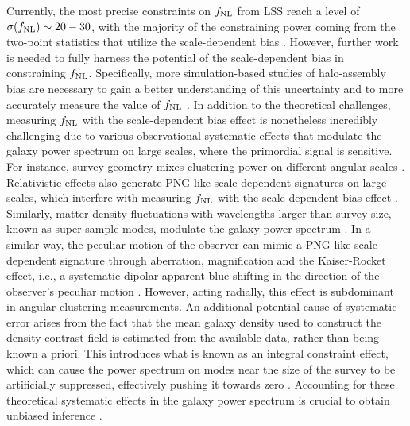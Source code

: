 Currently, the most precise constraints on $f_{\rm NL}$ from LSS reach a level of $\sigma(f_{\rm NL}) \sim 20-30$, with the majority of the constraining power coming from the two-point statistics that utilize the scale-dependent bias \citep{2019JCAP...09..010C, mueller2022primordial, 2022PhRvD.106d3506C, 2022arXiv220111518D}. However, further work is needed to fully harness the potential of the scale-dependent bias in constraining $f_{\rm NL}$. Specifically, more simulation-based studies of halo-assembly bias are necessary to gain a better understanding of this uncertainty and to more accurately measure the value of $f_{\rm NL}$ \citep{2020JCAP...12..013B, 2020JCAP...12..031B, 2022JCAP...11..013B, 2023JCAP...01..023L}. In addition to the theoretical challenges, measuring $f_{\rm NL}$ with the scale-dependent bias effect is nonetheless incredibly challenging due to various observational systematic effects that modulate the galaxy power spectrum on large scales, where the primordial signal is sensitive. For instance, survey geometry mixes clustering power on different angular scales \citep{beutler2014clustering,wilson2017rapid}. Relativistic effects also generate PNG-like scale-dependent signatures on large scales, which interfere with measuring $f_{\rm NL}$ with the scale-dependent bias effect \citep{wang2020}. Similarly, matter density fluctuations with wavelengths larger than survey size, known as super-sample modes, modulate the galaxy power spectrum \citep{castorina2020JCAP}. In a similar way, the peculiar motion of the observer can mimic a PNG-like scale-dependent signature through aberration, magnification and the Kaiser-Rocket effect, i.e., a systematic dipolar apparent blue-shifting in the direction of the observer's peculiar motion \citep{2021JCAP...11..027B}. However, acting radially, this effect is subdominant in angular clustering measurements. An additional potential cause of systematic error arises from the fact that the mean galaxy density used to construct the density contrast field is estimated from the available data, rather than being known a priori. This introduces what is known as an integral constraint effect, which can cause the power spectrum on modes near the size of the survey to be artificially suppressed, effectively pushing it towards zero \citep{peacock1991large,de2019integral}. Accounting for these theoretical systematic effects in the galaxy power spectrum is crucial to obtain unbiased inference \citep[see, e.g.,][]{riquelme2022primordial}. 

